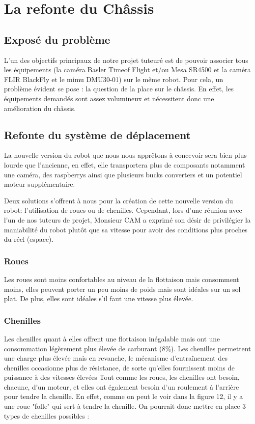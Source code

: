 \documentclass{PackagerQualityN}
\begin{document}
\clearpage


\newp
\section{La refonte du Châssis}
\subsection{Exposé du problème}
L'un des objectifs principaux de notre projet tuteuré est de pouvoir associer tous les équipements (la caméra Basler Timeof Flight et/ou Mesa SR4500 et la caméra FLIR BlackFly et le mimu DMU30-01) sur le même robot. Pour cela, un problème évident se pose : la question de la place sur le châssis.
En effet, les équipements demandés sont assez volumineux et nécessitent donc une amélioration du châssis. 


\subsection{Refonte du système de déplacement}
La nouvelle version du robot que nous nous apprêtons à concevoir sera bien plus lourde que l'ancienne, en effet, elle transportera plus de composants notamment une caméra, des raspberrys ainsi que plusieurs bucks converters et un potentiel moteur supplémentaire.


Deux solutions s'offrent à nous pour la création de cette nouvelle version du robot: l'utilisation de roues ou de chenilles. Cependant, lors d'une réunion avec l'un de nos tuteurs de projet, Monsieur CAM a exprimé son désir de privilégier la maniabilité du robot plutôt que sa vitesse pour avoir des conditions plus proches du réel (espace).


\subsubsection{Roues}
Les roues sont moins confortables au niveau de la flottaison mais consomment moins, elles peuvent porter un peu moins de poids mais sont idéales sur un sol plat. De plus, elles sont idéales s'il faut une vitesse plus élevée.

\subsubsection{Chenilles}
Les chenilles quant à elles offrent une flottaison inégalable mais ont une consommation légèrement plus élevée de carburant (8\%). Les chenilles permettent une charge plus élevée mais en revanche, le mécanisme d’entraînement des chenilles occasionne plus de résistance, de sorte qu’elles fournissent moins de puissance à des vitesses élevées
\newpage%
Tout comme les roues, les chenilles ont besoin, chacune, d'un moteur, et elles ont également besoin d'un roulement à l'arrière pour tendre la chenille. En effet, comme on peut le voir dans la figure 12, il y a une roue "folle" qui sert à tendre la chenille. On pourrait donc mettre en place 3 types de chenilles possibles :
\end{document}
